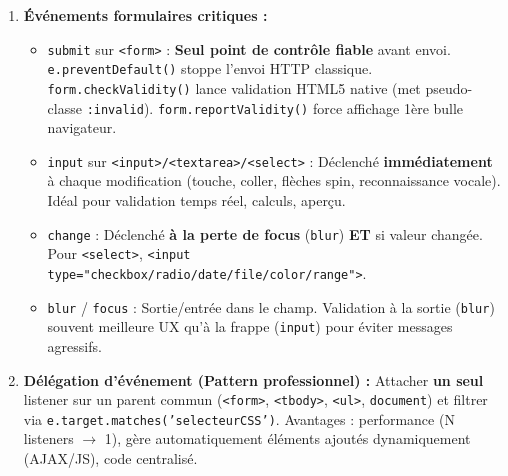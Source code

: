 \documentclass[11pt]{article}
\begin{document}
\begin{methode}
\begin{enumerate}
\begin{itemize}
                  \item \texttt{e.stopPropagation()} : Arrête la remontée (bouillonnement) vers les parents. \texttt{e.stopImmediatePropagation()} : arrête aussi les autres listeners sur \textbf{la même cible}.
              \end{itemize}
        \item \textbf{Événements formulaires critiques :}
              \begin{itemize}
                  \item \texttt{submit} sur \texttt{<form>} : \textbf{Seul point de contrôle fiable} avant envoi. \texttt{e.preventDefault()} stoppe l'envoi HTTP classique. \texttt{form.checkValidity()} lance validation HTML5 native (met pseudo-classe \texttt{:invalid}). \texttt{form.reportValidity()} force affichage 1ère bulle navigateur.
                  \item \texttt{input} sur \texttt{<input>/<textarea>/<select>} : Déclenché \textbf{immédiatement} à chaque modification (touche, coller, flèches spin, reconnaissance vocale). Idéal pour validation temps réel, calculs, aperçu.
                  \item \texttt{change} : Déclenché \textbf{à la perte de focus} (\texttt{blur}) \textbf{ET} si valeur changée. Pour \texttt{<select>}, \texttt{<input type="checkbox/radio/date/file/color/range">}.
                  \item \texttt{blur} / \texttt{focus} : Sortie/entrée dans le champ. Validation à la sortie (\texttt{blur}) souvent meilleure UX qu'à la frappe (\texttt{input}) pour éviter messages agressifs.
              \end{itemize}
        \item \textbf{Délégation d'événement (Pattern professionnel) :} Attacher \textbf{un seul} listener sur un parent commun (\texttt{<form>}, \texttt{<tbody>}, \texttt{<ul>}, \texttt{document}) et filtrer via \texttt{e.target.matches('selecteurCSS')}. Avantages : performance (N listeners $\rightarrow$ 1), gère automatiquement éléments ajoutés dynamiquement (AJAX/JS), code centralisé.
    \end{enumerate}
\end{methode}
\end{document}
